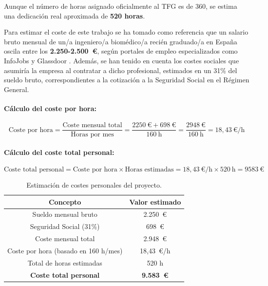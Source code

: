 Aunque el número de horas asignado oficialmente al TFG es de 360, se estima una dedicación real aproximada de \textbf{520 horas}.

Para estimar el coste de este trabajo se ha tomado como referencia que un salario bruto mensual de un/a ingeniero/a biomédico/a recién graduado/a en España oscila entre los \textbf{2.250-2.500~€}, según portales de empleo especializados como InfoJobs y Glassdoor \cite{infojobs2025, glassdoor2025}. Además, se han tenido en cuenta los costes sociales que asumiría la empresa al contratar a dicho profesional, estimados en un 31\% del sueldo bruto, correspondientes a la cotización a la Seguridad Social en el Régimen General.

\paragraph{Cálculo del coste por hora:}

\begin{equation}
\text{Coste por hora} = \frac{\text{Coste mensual total}}{\text{Horas por mes}} = \frac{2250~\text{€} + 698~\text{€}}{160 
~\text{h}}=\frac{2948~\text{€}}{160~\text{h}} = 18{,}43~\text{€/h}
\end{equation}

\paragraph{Cálculo del coste total personal:}

\begin{equation}
\text{Coste total personal} = \text{Coste por hora} \times \text{Horas estimadas} = 18,43~\text{€/h} \times 520~\text{h} = 9583~\text{€}
\end{equation}


\begin{table}[H]
\centering
\begin{tabular}{|c|c|}
\hline
\textbf{Concepto} & \textbf{Valor estimado} \\
\hline
Sueldo mensual bruto & 2.250~€ \\
Seguridad Social (31\%) & 698~€ \\
Coste mensual total & 2.948~€ \\
Coste por hora (basado en 160 h/mes) & 18,43~€/h \\
Total de horas estimadas & 520 h \\
\textbf{Coste total personal} & \textbf{9.583~€} \\
\hline
\end{tabular}
\caption{Estimación de costes personales del proyecto.}
\end{table}

